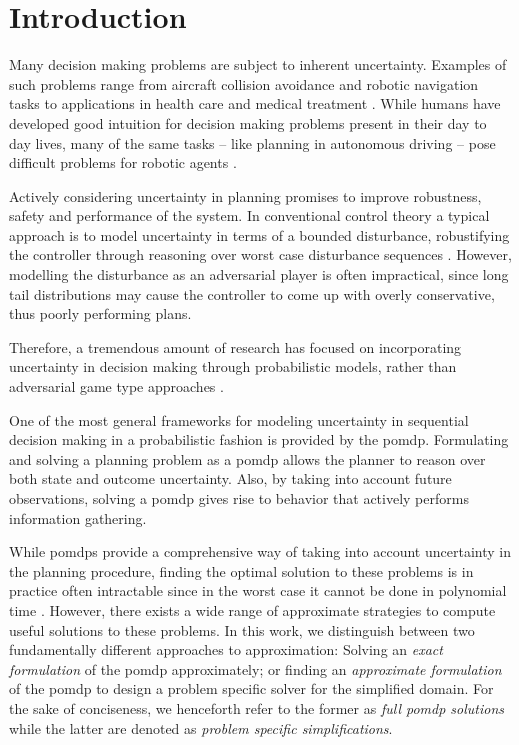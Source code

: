 \chapter{Introduction}\label{chap:introduction}

Many decision making problems are subject to inherent uncertainty. Examples of
such problems range from aircraft collision avoidance and robotic navigation
tasks to applications in health care and medical treatment
\cite{kochenderfer2012next, bandyopadhyay2013intention, pineau2003towards,
schaefer2005modeling}. While humans have developed good intuition for decision
making problems present in their day to day lives, many of the same tasks --
like planning in autonomous driving -- pose difficult problems for robotic
agents \cite{levinson2011towards}.

Actively considering uncertainty in planning promises to improve robustness,
safety and performance of the system. In conventional control theory a typical
approach is to model uncertainty in terms of a bounded disturbance,
robustifying the controller through reasoning over worst case disturbance
sequences \cite{petersen2012robust}. However, modelling the disturbance as an
adversarial player is often impractical, since long tail distributions may
cause the controller to come up with overly conservative, thus poorly
performing plans.

Therefore, a tremendous amount of research has focused on incorporating
uncertainty in decision making through probabilistic models, rather than
adversarial game type approaches \cite{roy1999coastal, amato2015planning,
fisac2018probabilistically, choudhury2019dynamic}.

One of the most general frameworks for modeling uncertainty in sequential
decision making in a probabilistic fashion is provided by the \ac{pomdp}.
Formulating and solving a planning problem as a \ac{pomdp} allows the planner
to reason over both state and outcome uncertainty. Also, by taking into account
future observations, solving a \ac{pomdp} gives rise to behavior that actively
performs information gathering.

While \acp{pomdp} provide a comprehensive way of taking into account
uncertainty in the planning procedure, finding the optimal solution to these
problems is in practice often intractable since in the worst case it cannot be
done in polynomial time \cite{papadimitriou1987complexity}. However, there
exists a wide range of approximate strategies to compute useful solutions to
these problems. In this work, we distinguish between two fundamentally
different approaches to approximation: Solving an \emph{exact formulation} of
the \ac{pomdp} approximately; or finding an \emph{approximate formulation} of
the \ac{pomdp} to design a problem specific solver for the simplified domain.
For the sake of conciseness, we henceforth refer to the former as \emph{full
\ac{pomdp} solutions} while the latter are denoted as \emph{problem specific
simplifications}.

